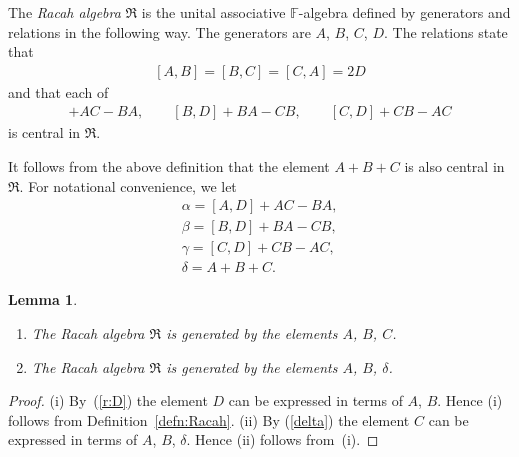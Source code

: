 \documentclass[11pt]{article}
\numberwithin{equation}{section}
\def\F{\mathbb F}
\numberwithin{equation}{section}
\newtheorem{Lemma}[Theorem]{Lemma}
\begin{document}
\begin{Definition}[{\cite[Definition 3.1]{SH:2017-1}}] \label{defn:Racah}
The {\it Racah algebra} $\Re$ is the unital associative $\F$-algebra defined by generators and relations in the following way. The generators are $A$, $B$, $C$, $D$. The relations state that
\begin{gather}\label{r:D}
[A,B]=[B,C]=[C,A]=2D
\end{gather}
and that each of
\begin{gather*}
[A,D]+AC-BA, \qquad [B,D]+BA-CB, \qquad[C,D]+CB-AC
\end{gather*}
is central in $\Re$.
\end{Definition}
It follows from the above definition that the element $A+B+C$ is also central in $\Re$. For notational convenience, we let
\begin{gather}
\alpha = [A,D]+AC-BA, \label{alpha} \\
\beta = [B,D]+BA-CB,\label{beta}\\
\gamma = [C,D]+CB-AC,\label{gamma}\\
\delta = A+B+C. \label{delta}
\end{gather}

\begin{Lemma}\label{lem:delta}\quad
\begin{enumerate}\itemsep=0pt
\item[$(i)$] The Racah algebra $\Re$ is generated by the elements $A$, $B$, $C$.
\item[$(ii)$] The Racah algebra $\Re$ is generated by the elements $A$, $B$, $\delta$.
\end{enumerate}
\end{Lemma}
\begin{proof}
(i) By~(\ref{r:D}) the element $D$ can be expressed in terms of $A$, $B$. Hence (i) follows from Definition~\ref{defn:Racah}.
(ii) By (\ref{delta}) the element $C$ can be expressed in terms of $A$, $B$, $\delta$. Hence (ii) follows from~(i).
\end{proof}
\end{document}
